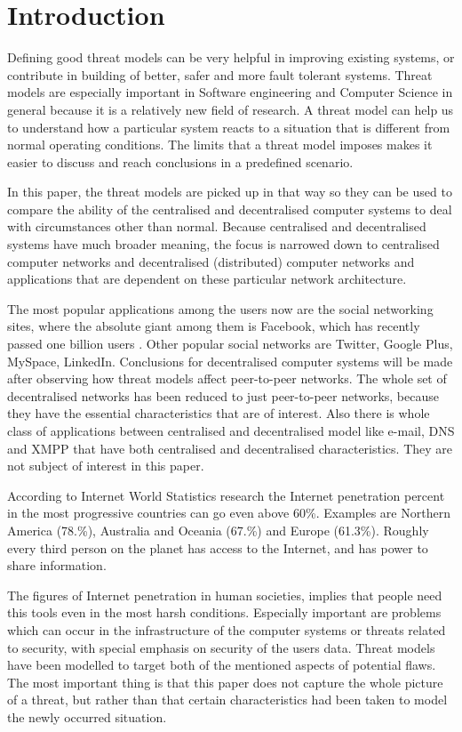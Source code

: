 \section{Introduction}
Defining good threat models can be very helpful in improving existing systems, or contribute in building of better, safer and more fault tolerant systems.
Threat models are especially important in Software engineering and Computer Science in general because it is a relatively new field of research.
A threat model can help us to understand how a particular system reacts to a situation that is different from normal operating conditions.
The limits that a threat model imposes makes it easier to discuss and reach conclusions in a predefined scenario.

In this paper, the threat models are picked up in that way so they can be used to compare the ability of the centralised and decentralised computer systems to deal with circumstances other than normal.
Because centralised and decentralised systems have much broader meaning, the focus is narrowed down to centralised computer networks and decentralised (distributed) computer networks and applications that are dependent on these particular network architecture.

The most popular applications among the users now are the social networking sites, where the absolute giant among them is Facebook, which has recently passed one billion users \cite{web:facebookpassesbillion}. Other popular social networks are Twitter, Google Plus, MySpace, LinkedIn.
Conclusions for decentralised computer systems will be made after observing how threat models affect peer-to-peer networks.
The whole set of decentralised networks has been reduced to just peer-to-peer networks, because they have the essential characteristics that are of interest.
Also there is whole class of applications between centralised and decentralised model like e-mail, DNS and XMPP that have both centralised and decentralised characteristics.
They are not subject of interest in this paper.

According to Internet World Statistics research \cite{web:internetworldstats} the Internet penetration percent in the most progressive countries can go even above 60\%.
Examples are Northern America (78.\%), Australia and Oceania (67.\%) and Europe (61.3\%).
Roughly every third person on the planet has access to the Internet, and has power to share information. 

The figures of Internet penetration \cite{web:internetworldstats} in human societies, implies that people need this tools even in the most harsh conditions.
Especially important are problems which can occur in the infrastructure of the computer systems or threats related to security, with special emphasis on security of the users data.
Threat models have been modelled to target both of the mentioned aspects of potential flaws.
The most important thing is that this paper does not capture the whole picture of a threat, but rather than that certain characteristics had been taken to model the newly occurred situation.

